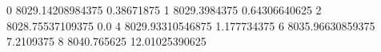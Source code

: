 0 8029.14208984375 0.38671875
1 8029.3984375 0.64306640625
2 8028.75537109375 0.0
4 8029.93310546875 1.177734375
6 8035.96630859375 7.2109375
8 8040.765625 12.01025390625

